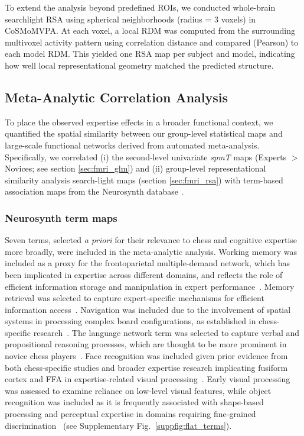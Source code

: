 \documentclass[preprint,12pt]{elsarticle}
\begin{document}
To extend the analysis beyond predefined ROIs, we conducted whole-brain searchlight RSA using spherical neighborhoods (radius = 3 voxels) in CoSMoMVPA. At each voxel, a local RDM was computed from the surrounding multivoxel activity pattern using correlation distance and compared (Pearson) to each model RDM. This yielded one RSA map per subject and model, indicating how well local representational geometry matched the predicted structure.

\subsection{Meta-Analytic Correlation Analysis}\label{sec:neurosynth_analysis}
To place the observed expertise effects in a broader functional context, we quantified the spatial similarity between our group-level statistical maps and large-scale functional networks derived from automated meta-analysis.  Specifically, we correlated (i) the second-level univariate \emph{spmT} maps (Experts $>$ Novices; see section \ref{sec:fmri_glm}) and (ii) group-level representational similarity analysis search-light maps (section \ref{sec:fmri_rsa}) with term-based association maps from the Neurosynth database \cite{yarkoni2011large}. 

\subsubsection{Neurosynth term maps}\label{sec:methods_neurosynth_terms}
Seven terms, selected \emph{a priori} for their relevance to chess and cognitive expertise more broadly, were included in the meta-analytic analysis. Working memory was included as a proxy for the frontoparietal multiple-demand network, which has been implicated in expertise across different domains, and reflects the role of efficient information storage and manipulation in expert performance~\cite{chase_skill_1982,ericsson_long-term_1995}. Memory retrieval was selected to capture expert-specific mechanisms for efficient information access~\cite{chase_skill_1982,ericsson_long-term_1995}. Navigation was included due to the involvement of spatial systems in processing complex board configurations, as established in chess-specific research~\cite{bilalic2012expertise,campitelli_brain_2007,epstein_parahippocampal_2008}. The language network term was selected to capture verbal and propositional reasoning processes, which are thought to be more prominent in novice chess players~\cite{bilalic_mechanisms_2010,de2014thought}. Face recognition was included given prior evidence from both chess-specific studies and broader expertise research implicating fusiform cortex and FFA in expertise-related visual processing~\cite{gauthier_activation_1999,gauthier_expertise_2000,bartlett_expertise_2013,bilalic_revisiting_2016}. Early visual processing was assessed to examine reliance on low-level visual features, while object recognition was included as it is frequently associated with shape-based processing and perceptual expertise in domains requiring fine-grained discrimination~\cite{bilalic2011takes,de2006discrimination} (see Supplementary Fig.~\ref{suppfig:flat_terms}).
\end{document}
